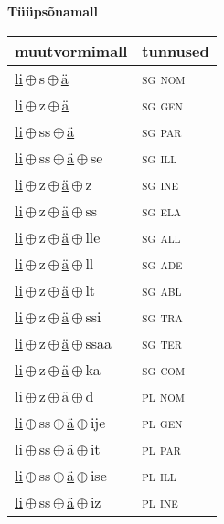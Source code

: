 

\vspace{3.5em}
\noindent \begin{minipage}{\textwidth}
\noindent \textbf{Tüüpsõnamall \,}\\

\begin{sideways}
\begin{tabular}{l l}
muutvormimall & tunnused \\
\hline
\underline{li}\,$\oplus$\,s\,$\oplus$\,\underline{ä} & \textsc{ sg nom } \\
\underline{li}\,$\oplus$\,z\,$\oplus$\,\underline{ä} & \textsc{ sg gen } \\
\underline{li}\,$\oplus$\,ss\,$\oplus$\,\underline{ä} & \textsc{ sg par } \\
\underline{li}\,$\oplus$\,ss\,$\oplus$\,\underline{ä}\,$\oplus$\,se & \textsc{ sg ill } \\
\underline{li}\,$\oplus$\,z\,$\oplus$\,\underline{ä}\,$\oplus$\,z & \textsc{ sg ine } \\
\underline{li}\,$\oplus$\,z\,$\oplus$\,\underline{ä}\,$\oplus$\,ss & \textsc{ sg ela } \\
\underline{li}\,$\oplus$\,z\,$\oplus$\,\underline{ä}\,$\oplus$\,lle & \textsc{ sg all } \\
\underline{li}\,$\oplus$\,z\,$\oplus$\,\underline{ä}\,$\oplus$\,ll & \textsc{ sg ade } \\
\underline{li}\,$\oplus$\,z\,$\oplus$\,\underline{ä}\,$\oplus$\,lt & \textsc{ sg abl } \\
\underline{li}\,$\oplus$\,z\,$\oplus$\,\underline{ä}\,$\oplus$\,ssi & \textsc{ sg tra } \\
\underline{li}\,$\oplus$\,z\,$\oplus$\,\underline{ä}\,$\oplus$\,ssaa & \textsc{ sg ter } \\
\underline{li}\,$\oplus$\,z\,$\oplus$\,\underline{ä}\,$\oplus$\,ka & \textsc{ sg com } \\
\underline{li}\,$\oplus$\,z\,$\oplus$\,\underline{ä}\,$\oplus$\,d & \textsc{ pl nom } \\
\underline{li}\,$\oplus$\,ss\,$\oplus$\,\underline{ä}\,$\oplus$\,ije & \textsc{ pl gen } \\
\underline{li}\,$\oplus$\,ss\,$\oplus$\,\underline{ä}\,$\oplus$\,it & \textsc{ pl par } \\
\underline{li}\,$\oplus$\,ss\,$\oplus$\,\underline{ä}\,$\oplus$\,ise & \textsc{ pl ill } \\
\underline{li}\,$\oplus$\,ss\,$\oplus$\,\underline{ä}\,$\oplus$\,iz & \textsc{ pl ine } \\

\end{tabular}
\end{sideways}
\end{minipage}
